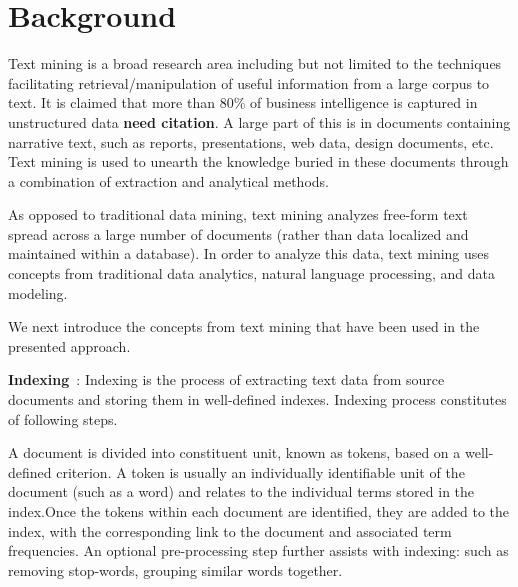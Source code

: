 \section{Background}
\label{sec:background}


Text mining is a broad research area including but not limited to the techniques facilitating retrieval/manipulation of useful information from a large corpus to text. 
It is claimed that more than 80\% of business intelligence is captured in unstructured data \textbf{need citation}. A large part of this is in documents containing narrative text, such as reports, presentations, web data, design documents, etc. Text mining is used to unearth the knowledge buried in these documents through a combination of extraction and analytical methods. 

As opposed to traditional data mining, text mining analyzes free-form text spread across a large number of documents (rather than data localized and maintained within a database). In order to analyze this data, text mining uses concepts from traditional data analytics, natural language processing, and data modeling.

We next introduce the concepts from text mining that have been used in the presented approach.


\textbf{Indexing}~\cite{frakes1992introduction,manning2008introduction}: Indexing is the process of extracting text data from source documents and storing them in well-defined indexes. Indexing process constitutes of following steps.

A document is divided into constituent unit, known as tokens, based on a well-defined criterion. A token is usually an individually identifiable unit of the document (such as a word) and relates to the individual terms stored in the index.Once the tokens within each document are identified, they are added to the index, with the corresponding link to the document and associated term frequencies. An optional pre-processing step further assists with indexing: such as removing stop-words, grouping similar words together. 


